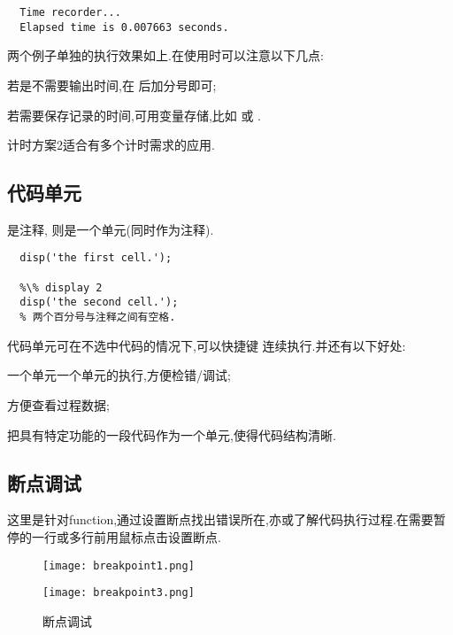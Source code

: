 \vspace{-0.8cm}
\begin{lstlisting}
  Time recorder...
  Elapsed time is 0.007663 seconds.
\end{lstlisting}

两个例子单独的执行效果如上.在使用时可以注意以下几点:
\begindot
  \item 若是不需要输出时间,在  后加分号即可;
  \item 若需要保存记录的时间,可用变量存储,比如  或  .
  \item 计时方案2适合有多个计时需求的应用.
\myenddot




\subsection{代码单元}
\mcode{\%} 是注释, \mcode{\%\%} 则是一个单元(同时作为注释). 

\vspace{-0.8cm}
\begin{lstlisting}[caption=代码单元]
  %\% display 1
  disp('the first cell.');

  %\% display 2
  disp('the second cell.');
  % 两个百分号与注释之间有空格.
\end{lstlisting}

代码单元可在不选中代码的情况下,可以快捷键  连续执行.并还有以下好处:
\begindot
  \item 一个单元一个单元的执行,方便检错/调试;
  \item 方便查看过程数据;
  \item 把具有特定功能的一段代码作为一个单元,使得代码结构清晰.
\myenddot



\subsection{断点调试}
这里是针对function,通过设置断点找出错误所在,亦或了解代码执行过程.在需要暂停的一行或多行前用鼠标点击设置断点.

\begin{figure}[htbp]
  \centering
  \texttt{[image: breakpoint1.png]}
\end{figure}

\begin{figure}[htbp]
  \centering
  \texttt{[image: breakpoint3.png]}
  \caption{断点调试}
\end{figure}

